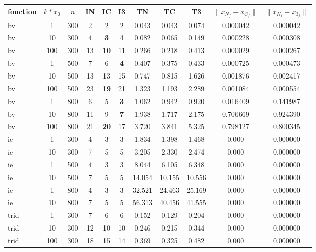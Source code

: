 \begin{table}%
	\begin{center}
{\small
\begin{tabular}{|l|c|c|c|c|c|c|c|c|c|c|}
  \hline fonction & $k*x_0$ & $n$ & IN & IC & I3 & TN & TC & T3 & $\lVert x_{N_f}-x_{C_f}\rVert $ & $\lVert x_{N_f}-x_{3_f}\rVert $  \\
 \hline
bv & 1 & 300 & 2 & 2 & 2 & 0.043 & 0.043 & 0.074 & 0.000042 & 0.000042 \\\hline 
bv & 10 & 300 & 4 & {\bf 3} & 4 & 0.082 & 0.065 & 0.149 & 0.000228 & 0.000308 \\\hline 
bv & 100 & 300 & 13 & {\bf 10 }& 11 & 0.266 & 0.218 & 0.413 & 0.000029 & 0.000267 \\\hline 
bv & 1 & 500 & 7 & 6 & {\bf 4} & 0.407 & 0.375 & 0.433 & 0.000725 & 0.000473 \\\hline 
bv & 10 & 500 & 13 & 13 & 15 & 0.747 & 0.815 & 1.626 & 0.001876 & 0.002417 \\\hline 
bv & 100 & 500 & 23 &{\bf 19} & 21 & 1.323 & 1.193 & 2.289 & 0.001084 & 0.000554 \\\hline 
bv & 1 & 800 & 6 & 5 &{\bf 3} & 1.062 & 0.942 & 0.920 & 0.016409 & 0.141987 \\\hline 
bv & 10 & 800 & 11 & 9 & {\bf 7} & 1.938 & 1.717 & 2.175 & 0.706669 & 0.924390 \\\hline 
bv & 100 & 800 & 21 &{\bf 20} & 17 & 3.720 & 3.841 & 5.325 & 0.798127 & 0.800345 \\\hline
ie & 1 & 300 & 4 & 3 & 3 & 1.834 & 1.398 & 1.468 & 0.000 & 0.000000 \\\hline 
ie & 10 & 300 & 7 & 5 & 5 & 3.205 & 2.330 & 2.474 & 0.000 & 0.000000 \\\hline 
ie & 1 & 500 & 4 & 3 & 3 & 8.044 & 6.105 & 6.348 & 0.000 & 0.000000 \\\hline 
ie & 10 & 500 & 7 & 5 & 5 & 14.054 & 10.155 & 10.556 & 0.000 & 0.000000 \\\hline 
ie & 1 & 800 & 4 & 3 & 3 & 32.521 & 24.463 & 25.169 & 0.000 & 0.000000 \\\hline 
ie & 10 & 800 & 7 & 5 & 5 & 56.313 & 40.456 & 41.555 & 0.000 & 0.000000 \\\hline 
trid & 1 & 300 & 7 & 6 & 6 & 0.152 & 0.129 & 0.204 & 0.000 & 0.000000 \\\hline 
trid & 10 & 300 & 12 & 10 & 10 & 0.246 & 0.215 & 0.344 & 0.000 & 0.000000 \\\hline 
trid & 100 & 300 & 18 & 15 & 14 & 0.369 & 0.325 & 0.482 & 0.000 & 0.000000 \\\hline 

\end{tabular}}
\end{center}
\end{table}
